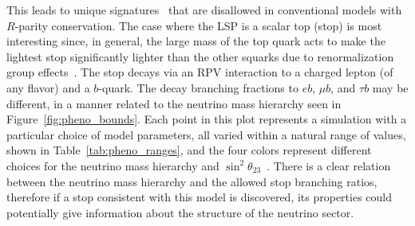 This leads to unique signatures~\cite{FileviezPerez:2012mj, Perez:2013kla,
Ovrut:2012wg, Ovrut:2014rba, Ovrut:2015uea} that are disallowed in conventional
models with $R$-parity conservation.
The case where the LSP is a scalar top (stop) is most interesting
since, in general, the large mass of the top quark acts to make the
lightest stop significantly lighter than the other squarks due to
renormalization group effects~\cite{Barbieri:1987fn,deCarlos:1993yy}.
The stop decays via an RPV interaction to a charged lepton (of any
flavor) and a $b$-quark.
The decay branching fractions to $e b$, $\mu b$, and $\tau b$ may be different,
in a manner related to the neutrino mass
hierarchy seen in Figure~\ref{fig:pheno_bounds}.
Each point in this plot represents a simulation with a particular choice of
model parameters, all varied within a natural range of values, shown in
Table~\ref{tab:pheno_ranges}, and the four colors represent different choices
for the neutrino mass hierarchy and 
$\sin^2\theta_{23}$~\cite{Marshall:2014cwa,Marshall:2014kea}.
There is a clear relation between the neutrino mass hierarchy and the allowed
stop branching ratios, therefore if a stop consistent with this model is
discovered, its properties could potentially give information about the
structure of the neutrino sector.

\begin{figure}[p]
\end{figure}

